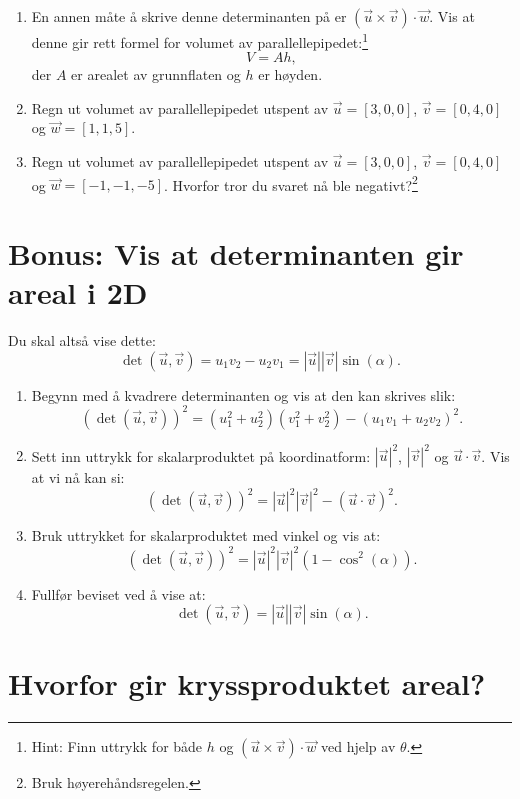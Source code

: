 \documentclass[a4paper,12pt]{article}
\begin{document}
\begin{enumerate}[label=\alph*)]
	\item En annen måte å skrive denne determinanten på er $(\vec u \times\vec v) \cdot \vec w$. Vis at denne gir rett formel for volumet av parallellepipedet:\footnote{Hint: Finn uttrykk for både $h$ og $(\vec u \times\vec v) \cdot \vec w$ ved hjelp av $\theta$.} \[V=Ah,\]der $A$ er arealet av grunnflaten og $h$ er høyden.
    \item Regn ut volumet av parallellepipedet utspent av $\vec{u}=[3,0,0]$, $\vec{v}=[0,4,0]$ og $\vec{w}=[1,1,5]$.
	\item Regn ut volumet av parallellepipedet utspent av $\vec{u}=[3,0,0]$, $\vec{v}=[0,4,0]$ og $\vec{w}=[-1,-1,-5]$. Hvorfor tror du svaret nå ble negativt?\footnote{Bruk høyerehåndsregelen.}
\end{enumerate}

\section*{Bonus: Vis at determinanten gir areal i 2D}

Du skal altså vise dette:
\[\det(\vec u, \vec v)= u_1v_2 - u_2v_1 = |\vec{u}| |\vec{v}| \sin(\alpha).\]

\begin{enumerate}

    \item[a)] Begynn med å kvadrere determinanten og vis at den kan skrives slik:
	\[
		(\det(\vec u, \vec v))^2 = (u_1^2 +u_2^2)(v_1^2 +v_2^2) - (u_1v_1 + u_2v_2)^2.
	\]
    \item[b)] Sett inn uttrykk for skalarproduktet på koordinatform: $|\vec u|^2$, $|\vec v|^2$ og $\vec u \cdot \vec v$. Vis at vi nå kan si:
	\[
		(\det(\vec u, \vec v))^2 = |\vec u|^2|\vec v|^2 - (\vec u \cdot \vec v)^2.
	\]
	    \item[c)] Bruk uttrykket for skalarproduktet med vinkel og vis at:
	\[
		(\det(\vec u, \vec v))^2 = |\vec u|^2|\vec v|^2(1-\cos^2(\alpha)).
	\]
	    \item[d)] Fullfør beviset ved å vise at:
	\[
		\det(\vec u, \vec v) = |\vec u||\vec v|\sin(\alpha).
		\tag*{\qed}
	\]

\end{enumerate}


\appendix
\newpage
\section{Hvorfor gir kryssproduktet areal?}
\end{document}
